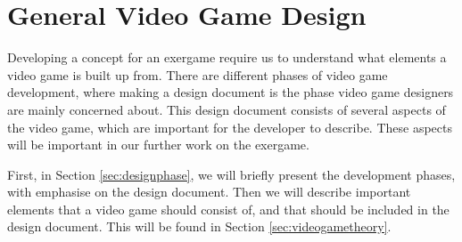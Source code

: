\chapter{General Video Game Design} 
\label{chap:vg}
Developing a concept for an exergame require us to understand what elements a video game is built up from. There are different phases of video game development, where making a design document is the phase video game designers are mainly concerned about. This design document consists of several aspects of the video game, which are important for the developer to describe. These aspects will be important in our further work on the exergame.

First, in Section \ref{sec:designphase}, we will briefly present the development phases, with emphasise on the design document. Then we will describe important elements that a video game should consist of, and that should be included in the design document.  This will be found in Section \ref{sec:videogametheory}.

